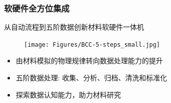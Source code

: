 %

\begin{frame}
	\frametitle{软硬件全方位集成}
	从自动流程到五阶数据创新材料软硬件一体机
\begin{figure}[h!]
\centering
\texttt{[image: Figures/BCC-5-steps\_small.jpg]}
\label{BCC-5-steps}
\end{figure}
\begin{itemize}
	\item 由材料模拟的物理规律转向数据处理能力的提升
	\item 五阶数据处理: 收集、分析、归档、清洗和标准化
	\item 探索数据认知能力，助力材料研究
\end{itemize}
\end{frame}


